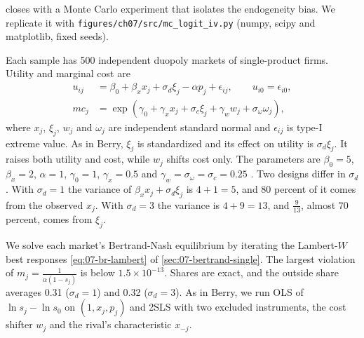 \citet[Section~8]{Berry1994} closes with a Monte Carlo experiment that isolates the endogeneity bias. We replicate it
with \texttt{figures/ch07/src/mc\_logit\_iv.py} (numpy, scipy and matplotlib, fixed seeds).

Each sample has 500 independent duopoly markets of single-product firms. Utility and marginal cost are
\begin{equation}\label{eq:07-mc-design}
  \begin{aligned}
  u_{ij} &= \beta_0 + \beta_x x_j + \sigma_d\xi_j - \alpha p_j + \epsilon_{ij}, \qquad u_{i0} = \epsilon_{i0}, \\
  mc_j &= \exp(\gamma_0 + \gamma_x x_j + \sigma_c\xi_j + \gamma_w w_j + \sigma_\omega\omega_j),
  \end{aligned}
\end{equation}
where $x_j$, $\xi_j$, $w_j$ and $\omega_j$ are independent standard normal and $\epsilon_{ij}$ is type-I extreme value.
As in Berry, $\xi_j$ is standardized and its effect on utility is $\sigma_d\xi_j$. It raises both utility and cost,
while $w_j$ shifts cost only.
The parameters are $\beta_0 = 5$, $\beta_x = 2$, $\alpha = 1$, $\gamma_0 = 1$, $\gamma_x = 0.5$ and $\gamma_w =
\sigma_\omega = \sigma_c = 0.25$ \citep[p.~258]{Berry1994}. Two designs differ in $\sigma_d$. With $\sigma_d = 1$ the
variance of $\beta_x x_j + \sigma_d\xi_j$ is $4 + 1 = 5$, and 80 percent of it comes from the observed $x_j$. With
$\sigma_d = 3$ the variance is $4 + 9 = 13$, and $\frac{9}{13}$, almost 70 percent, comes from $\xi_j$.

We solve each market's Bertrand-Nash equilibrium by iterating the Lambert-$W$ best responses
\eqref{eq:07-br-lambert} of \cref{sec:07-bertrand-single}. The largest violation of $m_j = \frac{1}{\alpha(1 - s_j)}$
is below $1.5 \times 10^{-13}$. Shares are exact, and the outside share averages 0.31 ($\sigma_d = 1$) and 0.32
($\sigma_d = 3$). As in Berry, we run OLS of $\ln s_j - \ln s_0$ on $(1, x_j, p_j)$ and 2SLS with two excluded
instruments, the cost shifter $w_j$ and the rival's characteristic $x_{-j}$.

